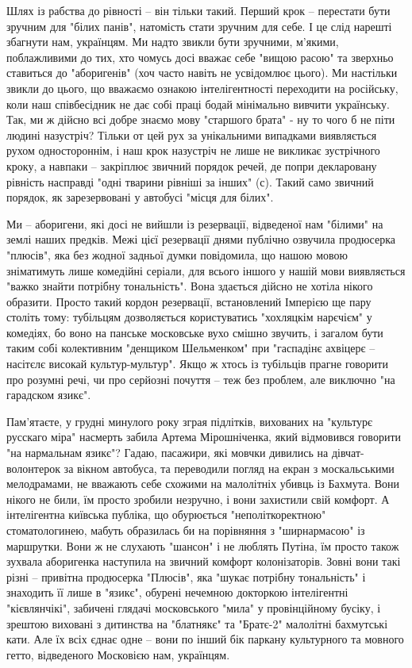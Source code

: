 Шлях із рабства до рівності – він тільки такий. Перший крок – перестати бути
зручним для "білих панів", натомість стати зручним для себе. І це слід нарешті
збагнути нам, українцям. Ми надто звикли бути зручними, м’якими, поблажливими
до тих, хто чомусь досі вважає себе "вищою расою" та зверхньо ставиться до
"аборигенів" (хоч часто навіть не усвідомлює цього). Ми настільки звикли до
цього, що вважаємо ознакою інтелігентності переходити на російську, коли наш
співбесідник не дає собі праці бодай мінімально вивчити українську. Так, ми ж
дійсно всі добре знаємо мову "старшого брата" - ну то чого б не піти людині
назустріч? Тільки от цей рух за унікальними випадками виявляється рухом
одностороннім, і наш крок назустріч не лише не викликає зустрічного кроку, а
навпаки – закріплює звичний порядок речей, де попри декларовану рівність
насправді "одні тварини рівніші за інших" (с). Такий само звичний порядок, як
зарезервовані у автобусі "місця для білих".

Ми – аборигени, які досі не вийшли із резервації, відведеної нам "білими" на
землі наших предків. Межі цієї резервації днями публічно озвучила продюсерка
"плюсів", яка без жодної задньої думки повідомила, що нашою мовою зніматимуть
лише комедійні серіали, для всього іншого у нашій мови виявляється "важко
знайти потрібну тональність". Вона здається дійсно не хотіла нікого образити.
Просто такий кордон резервації, встановлений Імперією ще пару століть тому:
тубільцям дозволяється користуватись "хохляцкім нарєчієм" у комедіях, бо воно
на панське московське вухо смішно звучить, і загалом бути таким собі
колективним "денщиком Шельменком" при "гаспадінє ахвіцерє – насітєлє високай
культур-мультур". Якщо ж хтось із тубільців прагне говорити про розумні речі,
чи про серйозні почуття – теж без проблем, але виключно "на гарадском язикє".

Пам’ятаєте, у грудні минулого року зграя підлітків, вихованих на "культурє
русскаго міра" насмерть забила Артема Мірошніченка, який відмовився говорити
"на нармальнам язикє"? Гадаю, пасажири, які мовчки дивились на
дівчат-волонтерок за вікном автобуса, та переводили погляд на екран з
москальськими мелодрамами, не вважають себе схожими на малолітніх убивць із
Бахмута. Вони нікого не били, їм просто зробили незручно, і вони захистили свій
комфорт. А інтелігентна київська публіка, що обурюється "неполіткоректною"
стоматологинею, мабуть образилась би на порівняння з "ширнармасою" із
маршрутки. Вони ж не слухають "шансон" і не люблять Путіна, їм просто також
зухвала аборигенка наступила на звичний комфорт колонізаторів. Зовні вони такі
різні – привітна продюсерка "Плюсів", яка "шукає потрібну тональність" і
знаходить її лише в "язикє", обурені нечемною докторкою інтелігентні
"кієвлянчікі", забичені глядачі московського "мила" у провінційному бусіку, і
зрештою виховані з дитинства на "блатнякє" та "Братє-2" малолітні бахмутські
кати. Але їх всіх єднає одне – вони по інший бік паркану культурного та мовного
гетто, відведеного Московією нам, українцям.


